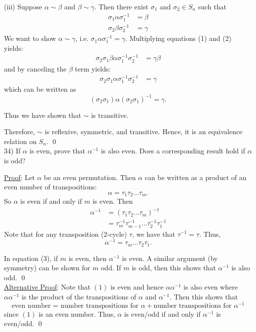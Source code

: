 \documentclass{article}
\begin{document}
(iii) Suppose $\alpha \sim \beta$ and $\beta \sim \gamma$. Then there exist $\sigma_1$ and $\sigma_2 \in S_n$ such that
\begin{align}
	\sigma_1 \alpha \sigma_1^{-1} &= \beta \\
	\sigma_2 \beta \sigma_2^{-1} &= \gamma
\end{align}
We want to show $\alpha \sim \gamma$, i.e. $\sigma_1 \alpha \sigma_1^{-1} = \gamma$. Multiplying equations (1) and (2) yields:
\begin{align*}
	\sigma_2 \sigma_1 \beta \alpha \sigma_1^{-1} \sigma_2^{-1} &= \gamma \beta
\end{align*}
and by canceling the $\beta$ term yields:
\begin{align*}
	\sigma_2 \sigma_1 \alpha \sigma_1^{-1} \sigma_2^{-1} &= \gamma
\end{align*}
which can be written as 
$$(\sigma_2 \sigma_1) \alpha (\sigma_2 \sigma_1)^{-1} = \gamma.$$

Thus we have shown that $\sim$ is transitive.

Therefore, $\sim$ is reflexive, symmetric, and transitive. Hence, it is an equivalence relation on $S_n$. \qed \\

34) If $\alpha$ is even, prove that $\alpha^{-1}$ is also even. Does a corresponding result hold if $\alpha$ is odd?

\underline{Proof}: Let $\alpha$ be an even permutation. Then $\alpha$ can be written as a product of an even number of transpositions: 
$$\alpha = \tau_1 \tau_2 \ldots \tau_m.$$
So $\alpha$ is even if and only if $m$ is even. Then
\begin{align*}
	\alpha^{-1} &= (\tau_1 \tau_2 \ldots \tau_m)^{-1} \\
	&= \tau_m^{-1} \tau_{m-1}^{-1} \ldots \tau_2^{-1} \tau_1^{-1}
\end{align*}
Note that for any transposition (2-cycle) $\tau$, we have that $\tau^{-1} = \tau$. Thus, 
\begin{equation}
	\alpha^{-1} = \tau_m \ldots \tau_2 \tau_1.
\end{equation}

In equation (3), if $m$ is even, then $\alpha^{-1}$ is even. A similar argument (by symmetry) can be shown for $m$ odd. If $m$ is odd, then this shows that $\alpha^{-1}$ is also odd. \qed \\

\underline{Alternative Proof}: Note that $(1)$ is even and hence $\alpha \alpha^{-1}$ is also even where $\alpha \alpha^{-1}$ is the product of the transpositions of $\alpha$ and $\alpha^{-1}$. Then this shows that
$$ \text{even number = number transpositions for } \alpha + \text{number transpositions for }\alpha^{-1}$$
since $(1)$ is an even number. Thus, $\alpha$ is even/odd if and only if $\alpha^{-1}$ is even/odd. \qed \\
\end{document}
